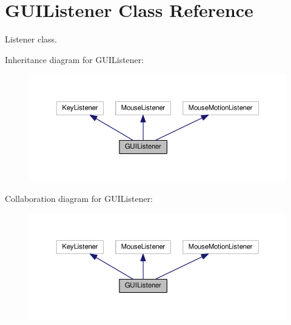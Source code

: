\hypertarget{classGUIListener}{}\section{G\+U\+I\+Listener Class Reference}
\label{classGUIListener}


Listener class.  




Inheritance diagram for G\+U\+I\+Listener\+:\nopagebreak
\begin{figure}[H]
\begin{center}
\leavevmode
\includegraphics[width=350pt]{classGUIListener__inherit__graph}
\end{center}
\end{figure}


Collaboration diagram for G\+U\+I\+Listener\+:\nopagebreak
\begin{figure}[H]
\begin{center}
\leavevmode
\includegraphics[width=350pt]{classGUIListener__coll__graph}
\end{center}
\end{figure}

